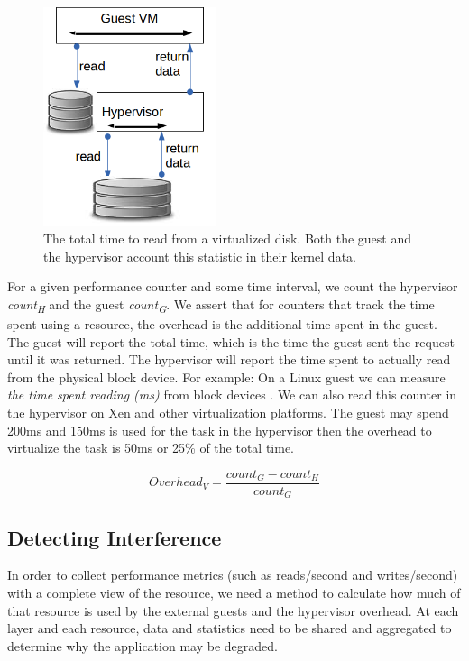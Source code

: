 \begin{figure}[!h]
  \begin{center}
  \includegraphics[width=2in]{images/ReadOperation.png}
  \caption{The total time to read from a virtualized disk.  Both the guest and the hypervisor account this statistic in their kernel data.}
  \label{virtStack}
  \end{center}
\end{figure}

\indent For a given performance counter and some time interval, we count the hypervisor \emph{count\textsubscript{H}} and the guest \emph{count\textsubscript{G}}.  
We assert that for counters that track the time spent using a resource, the overhead is the additional time spent in the guest.    
The guest will report the total time, which is the time the guest sent the request until it was returned.
The hypervisor will report the time spent to actually read from the physical block device.
For example:  On a Linux guest we can measure \emph{the time spent reading (ms)} from block devices \cite{diskstats}.  We can also read this counter in the hypervisor on Xen and other virtualization platforms.
The guest may spend 200ms and 150ms is used for the task in the hypervisor then the overhead to virtualize the task is 50ms or 25\% of the total time.

\begin{equation}
  Overhead_V = \frac{count_G - count_H}{count_G} 
\end{equation}

\subsection{Detecting Interference}
In order to collect performance metrics (such as reads/second and writes/second) with a complete view of the resource, we need a method to calculate how much of that resource is used by the external guests and the hypervisor overhead.  
At each layer and each resource, data and statistics need to be shared and aggregated to determine why the application may be degraded.

